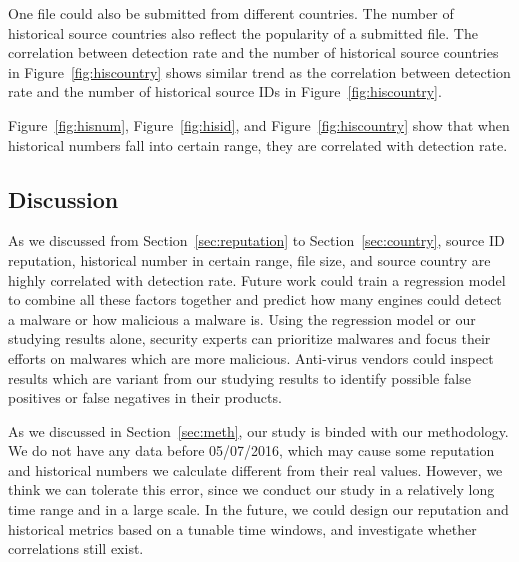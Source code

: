 One file could also be submitted from different countries. 
The number of historical source countries also reflect the popularity of a submitted file. 
The correlation between detection rate and the number of historical source countries in 
Figure~\ref{fig:hiscountry} shows similar trend as the correlation between detection rate 
and the number of historical source IDs in Figure~\ref{fig:hiscountry}. 

Figure~\ref{fig:hisnum}, Figure~\ref{fig:hisid}, and Figure~\ref{fig:hiscountry} show that 
when historical numbers fall into certain range, they are correlated with detection rate. 

\subsection{Discussion}

As we discussed from Section~\ref{sec:reputation} to Section~\ref{sec:country}, 
source ID reputation, historical number in certain range, file size, 
and source country are highly correlated with detection rate. 
Future work could train a regression model to combine all these factors together and 
predict how many engines could detect a malware or how malicious a malware is. 
Using the regression model or our studying results alone, 
security experts can prioritize malwares and focus their efforts on malwares which are more malicious. 
Anti-virus vendors could inspect results which are variant from our studying results 
to identify possible false positives or false negatives in their products. 

As we discussed in Section~\ref{sec:meth}, our study is binded with our methodology.
We do not have any data before 05/07/2016, 
which may cause some reputation and historical numbers 
we calculate different from their real values. 
However, we think we can tolerate this error, 
since we conduct our study in a relatively long time range and in a large scale. 
In the future, we could design our reputation and historical metrics based on a tunable time windows, and investigate whether correlations still exist.   
